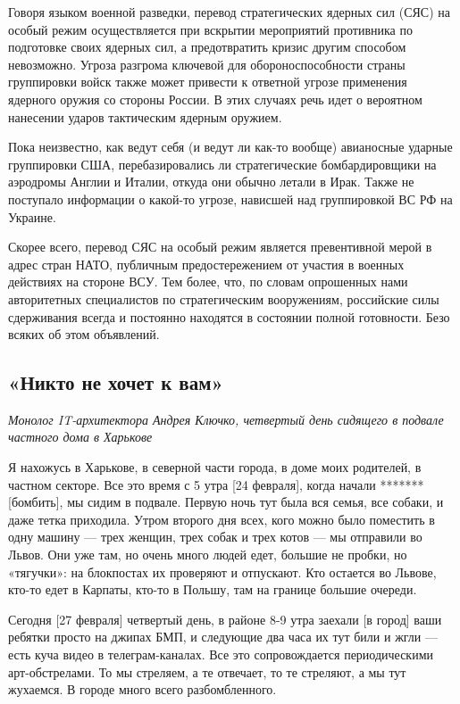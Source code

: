 Говоря языком военной разведки, перевод стратегических ядерных сил (СЯС) на особый режим осуществляется при вскрытии мероприятий противника по подготовке своих ядерных сил, а предотвратить кризис другим способом невозможно. Угроза разгрома ключевой для обороноспособности страны группировки войск также может привести к ответной угрозе применения ядерного оружия со стороны России. В этих случаях речь идет о вероятном нанесении ударов тактическим ядерным оружием.

Пока неизвестно, как ведут себя (и ведут ли как-то вообще) авианосные ударные группировки США, перебазировались ли стратегические бомбардировщики на аэродромы Англии и Италии, откуда они обычно летали в Ирак. Также не поступало информации о какой-то угрозе, нависшей над группировкой ВС РФ на Украине.

Скорее всего, перевод СЯС на особый режим является превентивной мерой в адрес стран НАТО, публичным предостережением от участия в военных действиях на стороне ВСУ. Тем более, что, по словам опрошенных нами авторитетных специалистов по стратегическим вооружениям, российские силы сдерживания всегда и постоянно находятся в состоянии полной готовности. Безо всяких об этом объявлений.

\subsection{«Никто не хочет к вам»}
\textit{Монолог IT-архитектора Андрея Ключко, четвертый день сидящего в подвале частного дома в Харькове}

Я нахожусь в Харькове, в северной части города, в доме моих родителей, в частном секторе. Все это время с 5 утра [24 февраля], когда начали ******* [бомбить], мы сидим в подвале. Первую ночь тут была вся семья, все собаки, и даже тетка приходила. Утром второго дня всех, кого можно было поместить в одну машину — трех женщин, трех собак и трех котов — мы отправили во Львов. Они уже там, но очень много людей едет, большие не пробки, но «тягучки»: на блокпостах их проверяют и отпускают. Кто остается во Львове, кто-то едет в Карпаты, кто-то в Польшу, там на границе большие очереди.

Сегодня [27 февраля] четвертый день, в районе 8-9 утра заехали [в город] ваши ребятки просто на джипах БМП, и следующие два часа их тут били и жгли — есть куча видео в телеграм-каналах. Все это сопровождается периодическими арт-обстрелами. То мы стреляем, а те отвечает, то те стреляют, а мы тут жухаемся. В городе много всего разбомбленного.

